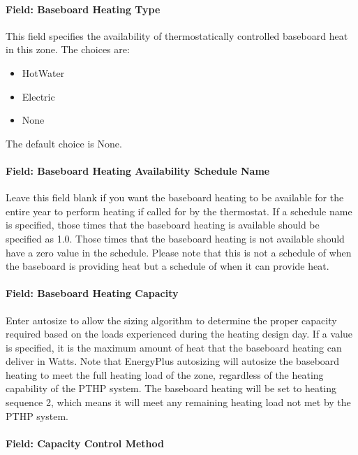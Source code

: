 \paragraph{Field: Baseboard Heating Type}\label{field-baseboard-heating-type-3}

This field specifies the availability of thermostatically controlled baseboard heat in this zone. The choices are:

\begin{itemize}
\item
  HotWater
\item
  Electric
\item
  None
\end{itemize}

The default choice is None.

\paragraph{Field: Baseboard Heating Availability Schedule Name}\label{field-baseboard-heating-availability-schedule-name-3}

Leave this field blank if you want the baseboard heating to be available for the entire year to perform heating if called for by the thermostat. If a schedule name is specified, those times that the baseboard heating is available should be specified as 1.0. Those times that the baseboard heating is not available should have a zero value in the schedule. Please note that this is not a schedule of when the baseboard is providing heat but a schedule of when it can provide heat.

\paragraph{Field: Baseboard Heating Capacity}\label{field-baseboard-heating-capacity-3}

Enter autosize to allow the sizing algorithm to determine the proper capacity required based on the loads experienced during the heating design day. If a value is specified, it is the maximum amount of heat that the baseboard heating can deliver in Watts. Note that EnergyPlus autosizing will autosize the baseboard heating to meet the full heating load of the zone, regardless of the heating capability of the PTHP system. The baseboard heating will be set to heating sequence 2, which means it will meet any remaining heating load not met by the PTHP system.

\paragraph{Field: Capacity Control Method}

